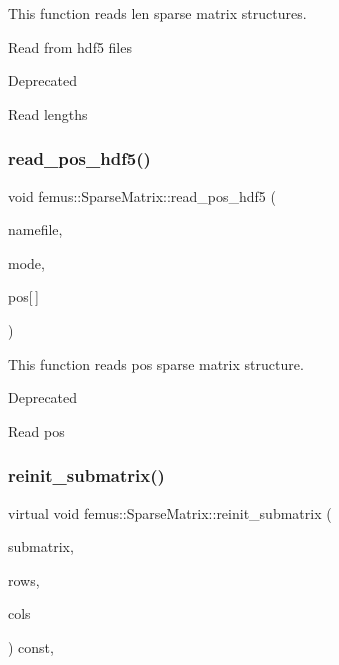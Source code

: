 This function reads len sparse matrix structures. 

Read from hdf5 files \begin{DoxyRefDesc}{Deprecated}
\item[\mbox{\hyperlink{deprecated__deprecated000004}{Deprecated}}]Read lengths \end{DoxyRefDesc}
\mbox{\label{classfemus_1_1_sparse_matrix_a45d81485e45cf4de16aed8e9a9188efc}} 
\subsubsection{\texorpdfstring{read\+\_\+pos\+\_\+hdf5()}{read\_pos\_hdf5()}}
{\footnotesize\ttfamily void femus\+::\+Sparse\+Matrix\+::read\+\_\+pos\+\_\+hdf5 (\begin{DoxyParamCaption}\item[{const std\+::string}]{namefile,  }\item[{const int}]{mode,  }\item[{int}]{pos\mbox{[}$\,$\mbox{]} }\end{DoxyParamCaption})\hspace{0.3cm}{\ttfamily [virtual]}}



This function reads pos sparse matrix structure. 

\begin{DoxyRefDesc}{Deprecated}
\item[\mbox{\hyperlink{deprecated__deprecated000005}{Deprecated}}]Read pos \end{DoxyRefDesc}
\mbox{\label{classfemus_1_1_sparse_matrix_a02d6bc31a4e96062e7a4f35bbc32d74b}} 
\subsubsection{\texorpdfstring{reinit\+\_\+submatrix()}{reinit\_submatrix()}}
{\footnotesize\ttfamily virtual void femus\+::\+Sparse\+Matrix\+::reinit\+\_\+submatrix (\begin{DoxyParamCaption}\item[{\mbox{\hyperlink{classfemus_1_1_sparse_matrix}{Sparse\+Matrix}} \&}]{submatrix,  }\item[{const std\+::vector$<$ int $>$ \&}]{rows,  }\item[{const std\+::vector$<$ int $>$ \&}]{cols }\end{DoxyParamCaption}) const\hspace{0.3cm}{\ttfamily [inline]}, {\ttfamily [virtual]}}

